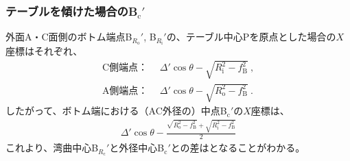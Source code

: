 \subsubsection{テーブルを傾けた場合のB\texorpdfstring{$_\mathrm c'$}{c'}}
外面A・C面側のボトム端点B$_{R_\mathrm o}'$, B$_{R_\mathrm i}'$の、テーブル中心Pを原点とした場合の$X$座標はそれぞれ、
\begin{subequations}
\begin{align}
  \label{eq:tableBRi}
  \text{C側端点：}&~~
  \varDelta'\cos\theta-\sqrt{R_\mathrm i^2-f_\mathrm B^2}\ ,\\
  \text{A側端点：}&~~
  \varDelta'\cos\theta-\sqrt{R_\mathrm o^2-f_\mathrm B^2}\ .
\end{align}
\end{subequations}
したがって、ボトム端における（AC外径の）中点B$_\mathrm c'$の$X$座標は、
\begin{align}
  \label{eq:tableBc}
  \varDelta'\cos\theta-\frac{\sqrt{R_\mathrm o^2-f_\mathrm B^2}+\sqrt{R_\mathrm i^2-f_\mathrm B^2}}2
\end{align}
これより、湾曲中心B$_{R_\mathrm c}'$と外径中心B$_\mathrm c'$との差はとなることがわかる。
\vfill
